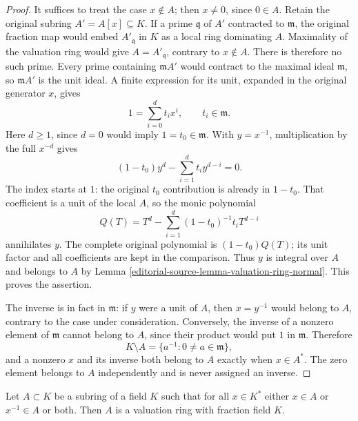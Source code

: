 \begin{proof}
It suffices to treat the case
$x\notin A$; then $x\neq0$,
since $0\in A$. Retain the
original subring $A'=A[x]\subseteq K$.
If a prime $\mathfrak q$ of
$A'$ contracted to $\mathfrak m$,
the original fraction map would
embed $A'_{\mathfrak q}$ in $K$
as a local ring dominating
$A$. Maximality of the valuation
ring would give $A=A'_{\mathfrak q}$,
contrary to $x\notin A$.
There is therefore no such
prime. Every prime containing
$\mathfrak m A'$ would contract
to the maximal ideal $\mathfrak m$,
so $\mathfrak m A'$ is the
unit ideal. A finite expression
for its unit, expanded in
the original generator $x$,
gives
$$
1=\sum_{i=0}^d t_i x^i,\qquad t_i\in\mathfrak m.
$$
Here $d\geq1$, since $d=0$
would imply $1=t_0\in\mathfrak m$.
With $y=x^{-1}$, multiplication
by the full $x^{-d}$ gives
$$
(1-t_0)y^d-\sum_{i=1}^d t_i y^{d-i}=0.
$$
The index starts at $1$:
the original $t_0$ contribution
is already in $1-t_0$.
That coefficient is a unit
of the local $A$, so the
monic polynomial
$$
Q(T)=T^d-\sum_{i=1}^d(1-t_0)^{-1}t_iT^{d-i}
$$
annihilates $y$. The complete
original polynomial is
$(1-t_0)Q(T)$; its unit
factor and all coefficients
are kept in the comparison.
Thus $y$ is integral over
$A$ and belongs to $A$ by
Lemma \ref{editorial-source-lemma-valuation-ring-normal}.
This proves the assertion.

The inverse is in fact in
$\mathfrak m$: if $y$ were
a unit of $A$, then
$x=y^{-1}$ would belong to
$A$, contrary to the case
under consideration. Conversely,
the inverse of a nonzero
element of $\mathfrak m$
cannot belong to $A$, since
their product would put $1$
in $\mathfrak m$. Therefore
$$
K\setminus A=\{a^{-1}:0\neq a\in\mathfrak m\},
$$
and a nonzero $x$ and its
inverse both belong to $A$
exactly when $x\in A^*$.
The zero element belongs to
$A$ independently and is
never assigned an inverse.
\end{proof}

\begin{lemma}
\label{editorial-source-lemma-x-or-x-inverse-valuation-ring}
Let $A \subset K$ be a subring of a field $K$ such that for all
$x \in K^*$ either $x \in A$ or $x^{-1} \in A$ or both.
Then $A$ is a valuation ring with fraction field $K$.
\end{lemma}

